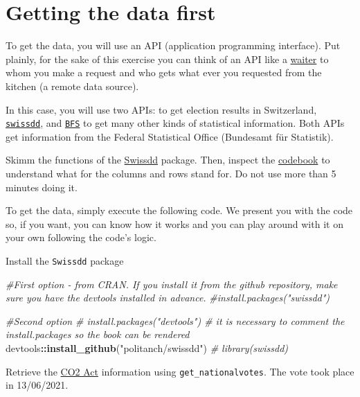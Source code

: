 \documentclass[
]{book}
\newenvironment{Shaded}{\begin{snugshade}}{\end{snugshade}}
\newcommand{\CommentTok}[1]{\textcolor[rgb]{0.56,0.35,0.01}{\textit{#1}}}
\newcommand{\FunctionTok}[1]{\textcolor[rgb]{0.13,0.29,0.53}{\textbf{#1}}}
\newcommand{\NormalTok}[1]{#1}
\newcommand{\SpecialCharTok}[1]{\textcolor[rgb]{0.81,0.36,0.00}{\textbf{#1}}}
\newcommand{\StringTok}[1]{\textcolor[rgb]{0.31,0.60,0.02}{#1}}
\begin{document}
\hypertarget{getting-the-data-first}{%
\section{Getting the data first}\label{getting-the-data-first}}

To get the data, you will use an API (application programming interface). Put plainly, for the sake of this exercise you can think of an API like a \href{https://www.youtube.com/watch?v=s7wmiS2mSXY}{waiter} to whom you make a request and who gets what ever you requested from the kitchen (a remote data source).

In this case, you will use two APIs: to get election results in Switzerland, \href{https://politanch.github.io/swissdd/index.html}{\texttt{swissdd}}, and \href{https://github.com/lgnbhl/BFS}{\texttt{BFS}} to get many other kinds of statistical information. Both APIs get information from the Federal Statistical Office (Bundesamt für Statistik).

Skimm the functions of the \href{https://politanch.github.io/swissdd/reference/index.html}{Swissdd} package. Then, inspect the \href{https://swissvotes.ch/storage/b47562b197b7725fcfa45b3e5a4abad1b4cf14cd377136f87fd4473329a51114}{codebook} to understand what for the columns and rows stand for. Do not use more than 5 minutes doing it.

To get the data, simply execute the following code. We present you with the code so, if you want, you can know how it works and you can play around with it on your own following the code's logic.

Install the \texttt{Swissdd} package

\begin{Shaded}
\begin{Highlighting}[]
\CommentTok{\#First option  {-} from CRAN. If you install it from the github repository, make sure you have the \textasciigrave{}devtools\textasciigrave{} installed in advance.}
\CommentTok{\#install.packages("swissdd")}

\CommentTok{\#Second option}
\CommentTok{\# install.packages("devtools") \# it is necessary to comment the install.packages so the book can be rendered}
\NormalTok{devtools}\SpecialCharTok{::}\FunctionTok{install\_github}\NormalTok{(}\StringTok{"politanch/swissdd"}\NormalTok{)}
\CommentTok{\# library(swissdd)}
\end{Highlighting}
\end{Shaded}

Retrieve the \href{https://swissvotes.ch/vote/644.00}{CO2 Act} information using \texttt{get\_nationalvotes}. The vote took place in 13/06/2021.
\end{document}
